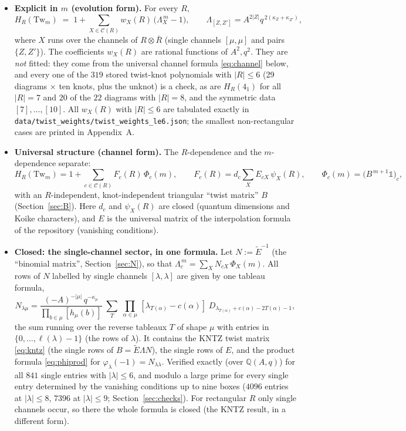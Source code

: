 \documentclass[11pt]{article}
\newcommand{\Tw}{\mathrm{Tw}}
\newcommand{\Lam}{\Lambda}
\newcommand{\Et}{\widetilde{E}}
\newcommand{\one}{\mathbb 1}
\newcommand{\Chan}{\mathcal C}
\newcommand{\Rbar}{\bar R}
\newcommand{\LMPH}[1]{\texttt{#1}}
\begin{document}
\begin{itemize}
\item \textbf{Explicit in $m$ (evolution form).}  For every $R$,
\begin{equation}\label{eq:evol}
H_R(\Tw_m)\;=\;1+\sum_{X\in\Chan(R)} w_X(R)\,\bigl(\Lam_X^{\,m}-1\bigr),\qquad
\Lam_{[Z,Z']}=A^{2|Z|}q^{\,2(\kappa_Z+\kappa_{Z'})},
\end{equation}
where $X$ runs over the channels of $R\otimes\Rbar$ (single channels $[\mu,\mu]$ and pairs $\{Z,Z'\}$).  The
coefficients $w_X(R)$ are rational functions of $A^2,q^2$.  They are \emph{not} fitted: they come from the universal
channel formula \eqref{eq:channel} below, and every one of the $319$ stored twist-knot polynomials with $|R|\le 6$
(29 diagrams $\times$ ten knots, plus the unknot) is a check, as are $H_R(4_1)$ for all $|R|=7$ and $20$ of the $22$
diagrams with $|R|=8$, and the symmetric data $[7],\dots,[10]$.  All $w_X(R)$ with $|R|\le6$ are tabulated exactly in
\LMPH{data/twist\_weights/twist\_weights\_le6.json}; the smallest non-rectangular cases are printed in Appendix~A.

\item \textbf{Universal structure (channel form).}  The $R$-dependence and the $m$-dependence separate:
\begin{equation}\label{eq:channel}
H_R(\Tw_m)=1+\sum_{c\in\Chan(R)}F_c(R)\,\Phi_c(m),\qquad
F_c(R)=d_c\sum_X E_{cX}\,\psi_X(R),\qquad
\Phi_c(m)=\bigl(B^{\,m+1}\one\bigr)_c ,
\end{equation}
with an $R$-independent, knot-independent triangular ``twist matrix'' $B$ (Section~\ref{sec:B}).  Here $d_c$ and
$\psi_X(R)$ are closed (quantum dimensions and Koike characters), and $E$ is the universal matrix of the interpolation
formula of the repository (vanishing conditions).

\item \textbf{Closed: the single-channel sector, in one formula.}  Let $N:=\Et^{-1}$ (the ``binomial matrix'',
Section~\ref{sec:N}), so that $\Lam_c^{\,m}=\sum_X N_{cX}\,\Phi_X(m)$.  All rows of $N$ labelled by single channels
$[\lambda,\lambda]$ are given by one tableau formula,
\begin{equation}\label{eq:tabsum}
N_{\lambda\mu}=\frac{(-A)^{-|\mu|}\,q^{-\kappa_\mu}}{\prod_{b\in\mu}[h_\mu(b)]}\;
\sum_{T}\;\prod_{\alpha\in\mu}\,[\lambda_{T(\alpha)}-c(\alpha)]\;D_{\lambda_{T(\alpha)}+c(\alpha)-2T(\alpha)-1},
\end{equation}
the sum running over the reverse tableaux $T$ of shape $\mu$ with entries in $\{0,\dots,\ell(\lambda)-1\}$ (the rows of
$\lambda$).  It contains the KNTZ twist matrix \eqref{eq:kntz} (the single rows of $B=\Et\Lam N$), the single rows of
$E$, and the product formula \eqref{eq:phiprod} for $\varphi_\lambda(-1)=N_{\lambda\lambda}$.  Verified exactly (over
$\mathbb Q(A,q)$) for all $841$ single entries with $|\lambda|\le6$, and modulo a large prime for every single entry
determined by the vanishing conditions up to nine boxes ($4096$ entries at $|\lambda|\le8$, $7396$ at $|\lambda|\le9$;
Section~\ref{sec:checks}).  For rectangular $R$ only single channels occur, so there the whole formula is closed
(the KNTZ result, in a different form).


\end{itemize}
\end{document}
